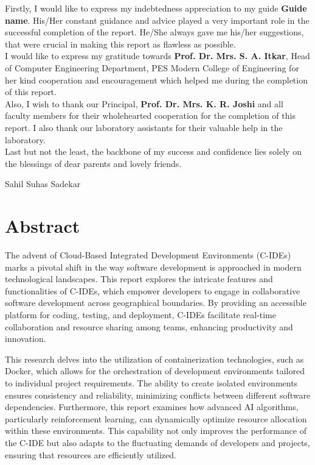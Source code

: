 \documentclass[12pt,a4paper,final]{report}
\begin{document}
Firstly, I would like to express my indebtedness appreciation to my guide \textbf{Guide name}. His/Her constant guidance and advice played a very important role  in the successful completion of the report. He/She always gave me his/her suggestions, that were crucial in making this report as flawless as possible.\\

I would like to express my gratitude towards \textbf{Prof. Dr. Mrs. S. A. Itkar},  Head of Computer Engineering Department, PES Modern College of Engineering for her kind cooperation and encouragement which helped me during the completion of this report.\\

Also, I wish to thank our Principal, \textbf{Prof. Dr. Mrs. K. R. Joshi} and all faculty members for their wholehearted cooperation for the completion of this report. I also thank our laboratory assistants for their valuable help in the laboratory. \\

Last but not the least, the backbone of my success and confidence lies solely on the blessings of dear parents and lovely friends.

\begin{flushright}
Sahil Suhas Sadekar\\
\end{flushright}


\pagestyle{plain} 
\cleardoublepage
{}
\tableofcontents
\newpage

\Large
\chapter*{\centering Abstract}
\normalsize
\noindent
The advent of Cloud-Based Integrated Development Environments (C-IDEs) marks a pivotal shift in the way software development is approached in modern technological landscapes. This report explores the intricate features and functionalities of C-IDEs, which empower developers to engage in collaborative software development across geographical boundaries. By providing an accessible platform for coding, testing, and deployment, C-IDEs facilitate real-time collaboration and resource sharing among teams, enhancing productivity and innovation.

This research delves into the utilization of containerization technologies, such as Docker, which allows for the orchestration of development environments tailored to individual project requirements. The ability to create isolated environments ensures consistency and reliability, minimizing conflicts between different software dependencies. Furthermore, this report examines how advanced AI algorithms, particularly reinforcement learning, can dynamically optimize resource allocation within these environments. This capability not only improves the performance of the C-IDE but also adapts to the fluctuating demands of developers and projects, ensuring that resources are efficiently utilized.
\end{document}
